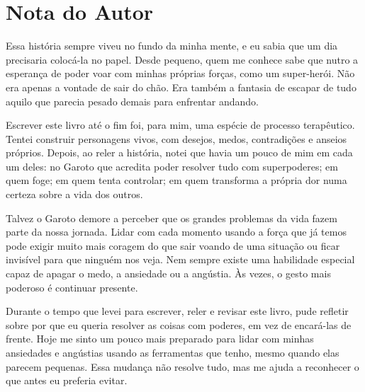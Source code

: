 \chapter*{Nota do Autor}
Essa história sempre viveu no fundo da minha mente, e eu sabia que um dia precisaria colocá-la no papel. Desde pequeno, quem me conhece sabe que nutro a esperança de poder voar com minhas próprias forças, como um super-herói. Não era apenas a vontade de sair do chão. Era também a fantasia de escapar de tudo aquilo que parecia pesado demais para enfrentar andando.

Escrever este livro até o fim foi, para mim, uma espécie de processo terapêutico. Tentei construir personagens vivos, com desejos, medos, contradições e anseios próprios. Depois, ao reler a história, notei que havia um pouco de mim em cada um deles: no Garoto que acredita poder resolver tudo com superpoderes; em quem foge; em quem tenta controlar; em quem transforma a própria dor numa certeza sobre a vida dos outros.

Talvez o Garoto demore a perceber que os grandes problemas da vida fazem parte da nossa jornada. Lidar com cada momento usando a força que já temos pode exigir muito mais coragem do que sair voando de uma situação ou ficar invisível para que ninguém nos veja. Nem sempre existe uma habilidade especial capaz de apagar o medo, a ansiedade ou a angústia. Às vezes, o gesto mais poderoso é continuar presente.

Durante o tempo que levei para escrever, reler e revisar este livro, pude refletir sobre por que eu queria resolver as coisas com poderes, em vez de encará-las de frente. Hoje me sinto um pouco mais preparado para lidar com minhas ansiedades e angústias usando as ferramentas que tenho, mesmo quando elas parecem pequenas. Essa mudança não resolve tudo, mas me ajuda a reconhecer o que antes eu preferia evitar.



  
  
  
  


